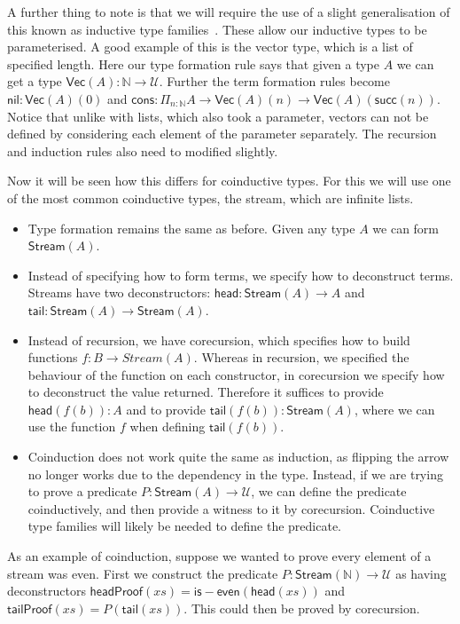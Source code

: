 \documentclass{article}
\theoremstyle{definition}
\theoremstyle{remark}
\begin{document}
A further thing to note is that we will require the use of a slight generalisation of this known as inductive type families~\cite[Section 5.7]{hottbook}. These allow our inductive types to be parameterised. A good example of this is the vector type, which is a list of specified length. Here our type formation rule says that given a type \(A\) we can get a type \(\mathsf{Vec}(A) : \mathbb{N} \to \mathcal{U}\). Further the term formation rules become \(\mathsf{nil} : \mathsf{Vec}(A)(0)\) and \(\mathsf{cons} : \Pi_{n : \mathbb{N}} A \to \mathsf{Vec}(A)(n) \to \mathsf{Vec}(A)(\mathsf{succ}(n))\). Notice that unlike with lists, which also took a parameter, vectors can not be defined by considering each element of the parameter separately. The recursion and induction rules also need to modified slightly.

Now it will be seen how this differs for coinductive types. For this we will use one of the most common coinductive types, the stream, which are infinite lists.

\begin{itemize}
\item Type formation remains the same as before. Given any type \(A\) we can form \(\mathsf{Stream}(A)\).
\item Instead of specifying how to form terms, we specify how to deconstruct terms. Streams have two deconstructors: \(\mathsf{head} : \mathsf{Stream}(A) \to A\) and \(\mathsf{tail} : \mathsf{Stream}(A) \to \mathsf{Stream}(A)\).
\item Instead of recursion, we have corecursion, which specifies how to build functions \(f : B \to Stream(A)\). Whereas in recursion, we specified the behaviour of the function on each constructor, in corecursion we specify how to deconstruct the value returned. Therefore it suffices to provide \(\mathsf{head}(f(b)) : A\) and to provide \(\mathsf{tail}(f(b)) : \mathsf{Stream}(A)\), where we can use the function \(f\) when defining \(\mathsf{tail}(f(b))\).
\item Coinduction does not work quite the same as induction, as flipping the arrow no longer works due to the dependency in the type. Instead, if we are trying to prove a predicate \(P : \mathsf{Stream}(A) \to \mathcal{U}\), we can define the predicate coinductively, and then provide a witness to it by corecursion. Coinductive type families will likely be needed to define the predicate.
\end{itemize}

As an example of coinduction, suppose we wanted to prove every element of a stream was even. First we construct the predicate \(P : \mathsf{Stream}(\mathbb{N}) \to \mathcal{U}\) as having deconstructors \(\mathsf{headProof}(xs) = \mathsf{is{-}even}(\mathsf{head}(xs))\) and \(\mathsf{tailProof}(xs) = P(\mathsf{tail}(xs))\). This could then be proved by corecursion.
\end{document}
